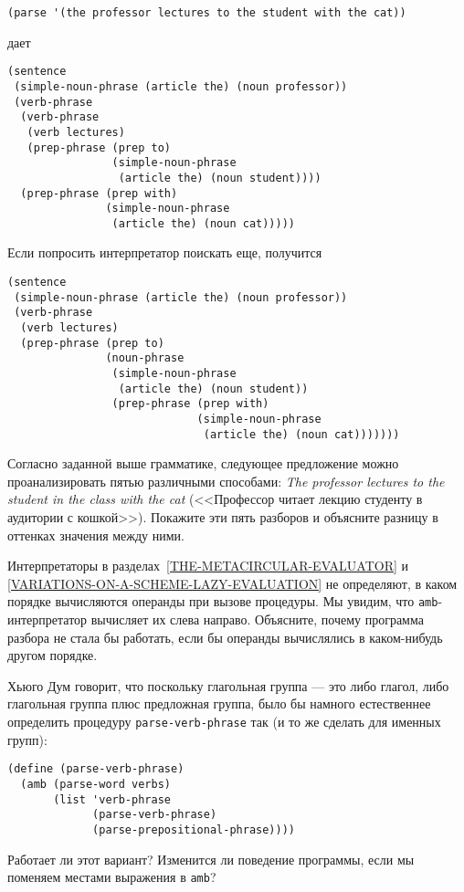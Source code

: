 \begin{Verbatim}[fontsize=\small]
(parse '(the professor lectures to the student with the cat))
\end{Verbatim}
дает

\begin{Verbatim}[fontsize=\small]
(sentence
 (simple-noun-phrase (article the) (noun professor))
 (verb-phrase
  (verb-phrase
   (verb lectures)
   (prep-phrase (prep to)
                (simple-noun-phrase
                 (article the) (noun student))))
  (prep-phrase (prep with)
               (simple-noun-phrase
                (article the) (noun cat)))))
\end{Verbatim}
Если попросить интерпретатор поискать еще, получится

\begin{Verbatim}[fontsize=\small]
(sentence
 (simple-noun-phrase (article the) (noun professor))
 (verb-phrase
  (verb lectures)
  (prep-phrase (prep to)
               (noun-phrase
                (simple-noun-phrase
                 (article the) (noun student))
                (prep-phrase (prep with)
                             (simple-noun-phrase
                              (article the) (noun cat)))))))
\end{Verbatim}

\begin{exercise}{4.45}%
\label{EX4.45}%
Согласно заданной выше грамматике, следующее
предложение можно проанализировать пятью различными способами:
{\em The professor lectures to the student in the class with the
cat}
(<<Профессор читает лекцию студенту в аудитории с кошкой>>). Покажите эти
пять разборов и объясните разницу в оттенках значения между ними.
\end{exercise}

\begin{exercise}{4.46}%
\label{EX4.46}%
%
Интерпретаторы в
разделах~\ref{THE-METACIRCULAR-EVALUATOR} и
\ref{VARIATIONS-ON-A-SCHEME-LAZY-EVALUATION} не
определяют, в каком порядке вычисляются операнды при вызове
процедуры.  Мы увидим, что {\tt amb}-интерпретатор вычисляет их
слева направо. Объясните, почему программа разбора не стала бы
работать, если бы операнды вычислялись в каком-нибудь другом
порядке.
\end{exercise}

\begin{exercise}{4.47}%
\label{EX4.47}%
Хьюго Дум говорит, что поскольку глагольная группа
--- это либо глагол, либо глагольная группа плюс предложная группа,
было бы намного естественнее определить процедуру
{\tt parse-verb-phrase} так (и то же сделать для именных
групп):

\begin{Verbatim}[fontsize=\small]
(define (parse-verb-phrase)
  (amb (parse-word verbs)
       (list 'verb-phrase
             (parse-verb-phrase)
             (parse-prepositional-phrase))))
\end{Verbatim}
Работает ли этот вариант?  Изменится ли поведение программы, если мы
поменяем местами выражения в {\tt amb}?
\end{exercise}

